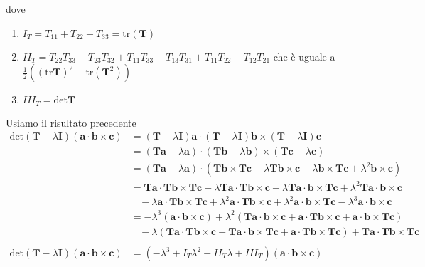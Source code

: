 \documentclass[10pt,a4paper,twoside]{book}
\begin{document}
\begin{enumerate}
dove
\begin{enumerate}
\item $I_{T} =T_{11} +T_{22} +T_{33} =\mathrm{tr}(\mathbf{T})$
\item $II_{T} =T_{22} T_{33} -T_{23} T_{32} +T_{11} T_{33} -T_{13} T_{31} +T_{11} T_{22} -T_{12} T_{21}$ che è uguale a $\frac{1}{2}\left((\mathrm{tr}\mathbf{T})^{2} -\mathrm{tr}\left(\mathbf{T}^{2}\right)\right)$
\item $III_{T} =\mathrm{det}\mathbf{T}$
\end{enumerate}

Usiamo il risultato precedente\begin{equation*}
\begin{aligned}
\mathrm{det}(\mathbf{T} -\lambda \mathbf{I})(\mathbf{a} \cdotp \mathbf{b} \times \mathbf{c}) & =(\mathbf{T} -\lambda \mathbf{I})\mathbf{a} \cdotp (\mathbf{T} -\lambda \mathbf{I})\mathbf{b} \times (\mathbf{T} -\lambda \mathbf{I})\mathbf{c}\\
 & =(\mathbf{Ta} -\lambda \mathbf{a}) \cdotp (\mathbf{Tb} -\lambda \mathbf{b}) \times (\mathbf{Tc} -\lambda \mathbf{c})\\
 & =(\mathbf{Ta} -\lambda \mathbf{a}) \cdotp \left(\mathbf{Tb} \times \mathbf{Tc} -\lambda \mathbf{Tb} \times \mathbf{c} -\lambda \mathbf{b} \times \mathbf{Tc} +\lambda ^{2}\mathbf{b} \times \mathbf{c}\right)\\
 & =\mathbf{Ta} \cdotp \mathbf{Tb} \times \mathbf{Tc} -\lambda \mathbf{Ta} \cdotp \mathbf{Tb} \times \mathbf{c} -\lambda \mathbf{Ta} \cdotp \mathbf{b} \times \mathbf{Tc} +\lambda ^{2}\mathbf{Ta} \cdotp \mathbf{b} \times \mathbf{c}\\
 & \ \ \ \ -\lambda \mathbf{a} \cdotp \mathbf{Tb} \times \mathbf{Tc} +\lambda ^{2}\mathbf{a} \cdotp \mathbf{Tb} \times \mathbf{c} +\lambda ^{2}\mathbf{a} \cdotp \mathbf{b} \times \mathbf{Tc} -\lambda ^{3}\mathbf{a} \cdotp \mathbf{b} \times \mathbf{c}\\
 & =-\lambda ^{3}(\mathbf{a} \cdotp \mathbf{b} \times \mathbf{c}) +\lambda ^{2}(\mathbf{Ta} \cdotp \mathbf{b} \times \mathbf{c} +\mathbf{a} \cdotp \mathbf{Tb} \times \mathbf{c} +\mathbf{a} \cdotp \mathbf{b} \times \mathbf{Tc})\\
 & \ \ \ \ -\lambda (\mathbf{Ta} \cdotp \mathbf{Tb} \times \mathbf{c} +\mathbf{Ta} \cdotp \mathbf{b} \times \mathbf{Tc} +\mathbf{a} \cdotp \mathbf{Tb} \times \mathbf{Tc}) +\mathbf{Ta} \cdotp \mathbf{Tb} \times \mathbf{Tc}\\
 & \\
\mathrm{det}(\mathbf{T} -\lambda \mathbf{I})(\mathbf{a} \cdotp \mathbf{b} \times \mathbf{c}) & =\left( -\lambda ^{3} +I_{T} \lambda ^{2} -II_{T} \lambda +III_{T}\right)(\mathbf{a} \cdotp \mathbf{b} \times \mathbf{c})
\end{aligned}
\end{equation*}


\end{enumerate}
\end{document}
